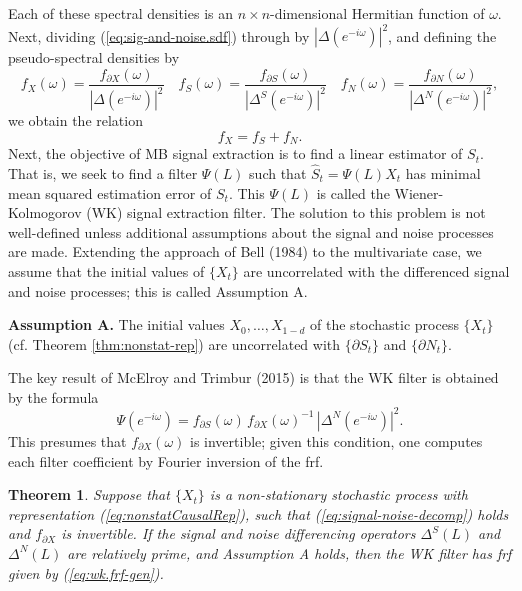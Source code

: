 \documentclass[a4paper]{book}
\newtheorem{Theorem}{Theorem}
\begin{document}
  Each of these spectral densities
   is an $n \times n$-dimensional Hermitian function of $\omega$.
   Next, dividing (\ref{eq:sig-and-noise.sdf}) through by ${| \Delta (e^{-i\omega}) |}^2$,
  and defining the pseudo-spectral densities by
\begin{equation}
\label{eq:pseudo-sdf}
  f_X (\omega) = \frac{ f_{\partial X} (\omega)}{ {| \Delta (e^{-i\omega}) |}^2 }
  \quad   f_S (\omega) = \frac{ f_{\partial S} (\omega)}{ {| \Delta^S (e^{-i\omega}) |}^2 }
  \quad   f_N (\omega) = \frac{ f_{\partial N} (\omega)}{ {| \Delta^N (e^{-i\omega}) |}^2 },
\end{equation}
  we obtain the relation
\[
  f_X = f_S + f_N.
\]
 Next, the objective of MB signal extraction is to find a linear estimator 
   of $S_t$.  That is,  we seek to find a filter $\Psi (L)$ such that
  $\widehat{S}_{t} = \Psi (L) X_t$ has minimal mean squared estimation error of
   $S_{t}$.   This $\Psi (L)$ is called the Wiener-Kolmogorov (WK) signal extraction filter.
   The solution to this problem is not well-defined unless 
   additional assumptions about the signal and noise processes are made.  
   Extending the approach of Bell (1984) to the multivariate case,
   we assume that the initial values of $\{ X_t \}$ are uncorrelated with
    the differenced signal and noise processes; this is called Assumption A.
    
   {\bf Assumption A.}  The initial values   $X_0, \ldots, X_{1-d}$
   of the stochastic process  $\{ X_t \}$ (cf. Theorem  \ref{thm:nonstat-rep})
      are uncorrelated with $\{ \partial S_t \}$ and $\{ \partial N_t \}$.

\vspace{.25cm}
 
   
   The key result of McElroy and Trimbur (2015) is that the WK filter is
   obtained by the formula
  \begin{equation}
  \label{eq:wk.frf-gen}
    \Psi (e^{-i \omega}) =   f_{\partial S} (\omega) \, 
    { f_{\partial X} (\omega) }^{-1} \, {| \Delta^N (e^{-i \omega}) |}^2.
  \end{equation}
  This presumes that $f_{\partial X} (\omega) $ is invertible; given this condition,
    one computes each filter coefficient by Fourier inversion of the frf.  
    
\begin{Theorem}
\label{thm:wk}
 Suppose that $\{ X_t \}$ is  a non-stationary stochastic process
 with representation (\ref{eq:nonstatCausalRep}), such that
 (\ref{eq:signal-noise-decomp}) holds and $f_{\partial X}$ is invertible.
 If the signal and noise differencing operators
 $\Delta^S (L)$ and $\Delta^N (L)$ are relatively prime, and Assumption A holds,
 then the WK filter has frf given by (\ref{eq:wk.frf-gen}).
\end{Theorem}
 
\end{document}
